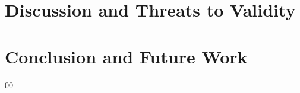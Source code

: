 \documentclass[conference]{IEEEtran}
\begin{document}
\section{Discussion and Threats to Validity}
\label{sec:threats}


\section{Conclusion and Future Work}
\label{sec:conclusion}

%   
%   

\begin{thebibliography}{00}






\end{thebibliography}
\end{document}
